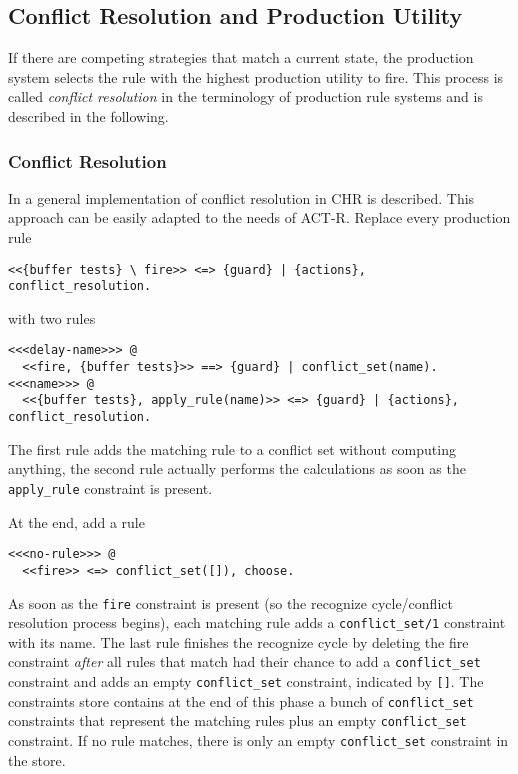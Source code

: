 \subsection{Conflict Resolution and Production Utility}

If there are competing strategies that match a current state, the production system selects the rule with the highest production utility to fire. This process is called \emph{conflict resolution} in the terminology of production rule systems and is described in the following.

\subsubsection{Conflict Resolution}
\label{implementation:conflict_resolution}

In \cite[151\psqq]{fru_chr_book_2009} a general implementation of conflict resolution in CHR is described. This approach can be easily adapted to the needs of ACT-R. Replace every production rule

\begin{lstlisting}
<<{buffer tests} \ fire>> <=> {guard} | {actions}, conflict_resolution.
\end{lstlisting}

with two rules

\begin{lstlisting}[caption={Translation scheme for production rules regarding conflict resolution}, label=lst:conflict_resolution_scheme]
<<<delay-name>>> @
  <<fire, {buffer tests}>> ==> {guard} | conflict_set(name).
<<<name>>> @
  <<{buffer tests}, apply_rule(name)>> <=> {guard} | {actions}, conflict_resolution.
\end{lstlisting}

The first rule adds the matching rule to a conflict set without computing anything, the second rule actually performs the calculations as soon as the \lstinline|apply_rule| constraint is present.

At the end, add a rule

\begin{lstlisting}
<<<no-rule>>> @
  <<fire>> <=> conflict_set([]), choose.
\end{lstlisting}

As soon as the \lstinline|fire| constraint is present (so the recognize cycle/conflict resolution process begins), each matching rule adds a \lstinline|conflict_set/1| constraint with its name. The last rule finishes the recognize cycle by deleting the fire constraint \emph{after} all rules that match had their chance to add a \lstinline|conflict_set| constraint and adds an empty \lstinline|conflict_set| constraint, indicated by \lstinline|[]|. The constraints store contains at the end of this phase a bunch of \lstinline|conflict_set| constraints that represent the matching rules plus an empty \lstinline|conflict_set| constraint. If no rule matches, there is only an empty \lstinline|conflict_set| constraint in the store.

